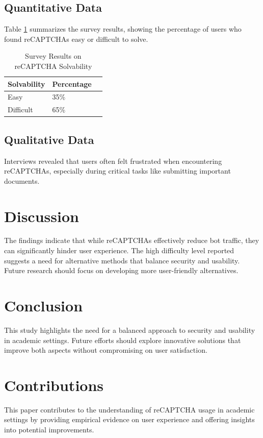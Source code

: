 \documentclass{article}
\begin{document}
\subsection{Quantitative Data}
Table \ref{tab:results} summarizes the survey results, showing the percentage of users who found reCAPTCHAs easy or difficult to solve.

\begin{table}[h]
\centering
\caption{Survey Results on reCAPTCHA Solvability}
\label{tab:results}
\begin{tabular}{@{}lll@{}}
\toprule
\textbf{Solvability} & \textbf{Percentage} \\ \midrule
Easy & 35\% \\
Difficult & 65\% \\ \bottomrule
\end{tabular}
\end{table}

\subsection{Qualitative Data}
Interviews revealed that users often felt frustrated when encountering reCAPTCHAs, especially during critical tasks like submitting important documents.

\section{Discussion}
The findings indicate that while reCAPTCHAs effectively reduce bot traffic, they can significantly hinder user experience. The high difficulty level reported suggests a need for alternative methods that balance security and usability. Future research should focus on developing more user-friendly alternatives.

\section{Conclusion}
This study highlights the need for a balanced approach to security and usability in academic settings. Future efforts should explore innovative solutions that improve both aspects without compromising on user satisfaction.

\section{Contributions}
This paper contributes to the understanding of reCAPTCHA usage in academic settings by providing empirical evidence on user experience and offering insights into potential improvements.



\end{document}

